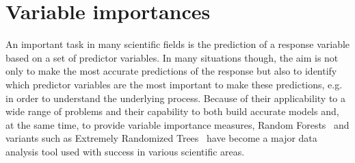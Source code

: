 \chapter{Variable importances}\label{ch:importances}



An important task in many scientific fields is the prediction of  a response
variable based on a set of predictor variables. In many situations though, the
aim is not only to make the most accurate predictions of the response but also
to identify which predictor variables are the most important to make these
predictions, e.g. in order to understand the underlying process. Because of
their applicability to a wide range of problems and their capability to both
build accurate models and, at the same time, to provide variable importance
measures, Random Forests~\citep{breiman:2001} and variants such as Extremely
Randomized Trees~\citep{geurts:2006} have become a major data analysis tool
used with success in various scientific areas.


